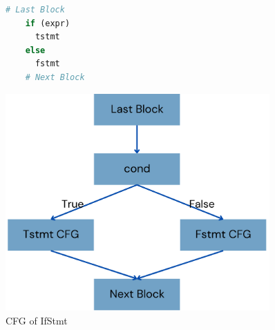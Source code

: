 \begin{figure}
  \centering
  \begin{minipage}{0.45\textwidth}
    \begin{lstlisting}[language=python]
    # Last Block
    if (expr)
      tstmt
    else
      fstmt
    # Next Block
    \end{lstlisting}
  \end{minipage}%
  \hfill
  \begin{minipage}{0.45\textwidth}
    \centering
    \includegraphics[width=0.9\textwidth]{img/ifstmt-cfg.png}
  \end{minipage}
  \caption{CFG of IfStmt}
\end{figure}

